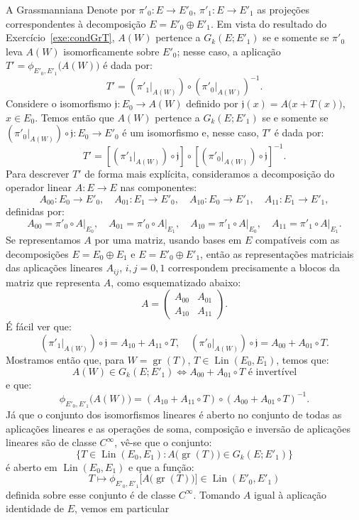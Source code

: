 \documentclass[oneside,11pt]{amsart}
\DeclareMathOperator{\Gr}{gr}
\DeclareMathOperator{\Lin}{Lin}
\theoremstyle{remark}\newtheorem{exercise}{Exercício}[section]
\theoremstyle{plain}\newtheorem{teo}{Teorema}[section]
\theoremstyle{plain}\newtheorem{lem}[teo]{Lema}
\theoremstyle{plain}\newtheorem{prop}[teo]{Proposição}
\theoremstyle{definition}\newtheorem{defin}[teo]{Definição}
\theoremstyle{remark}\newtheorem{rem}[teo]{Observação}
\theoremstyle{definition}\newtheorem{example}[teo]{Exemplo}
\numberwithin{equation}{section}
\begin{document}
\begin{section}{A Grassmanniana}
Denote por $\pi'_0:E\to E'_0$, $\pi'_1:E\to E'_1$ as projeções correspondentes à decomposição $E=E'_0\oplus E'_1$.
Em vista do resultado do Exercício~\ref{exe:condGrT}, $A(W)$ pertence a $G_k(E;E'_1)$ se e somente se $\pi'_0$ leva
$A(W)$ isomorficamente sobre $E'_0$; nesse caso, a aplicação $T'=\phi_{E'_0,E'_1}\big(A(W)\big)$ é dada por:
\[T'=(\pi'_1\vert_{A(W)})\circ(\pi'_0\vert_{A(W)})^{-1}.\]
Considere o isomorfismo $\mathfrak j:E_0\to A(W)$ definido por $\mathfrak j(x)=A\big(x+T(x)\big)$, $x\in E_0$.
Temos então que $A(W)$ pertence
a $G_k(E;E'_1)$ se e somente se $(\pi'_0\vert_{A(W)})\circ\mathfrak j:E_0\to E'_0$ é um isomorfismo e, nesse caso,
$T'$ é dada por:
\[T'=[(\pi'_1\vert_{A(W)})\circ\mathfrak j]\circ[(\pi'_0\vert_{A(W)})\circ\mathfrak j]^{-1}.\]
Para descrever $T'$ de forma mais explícita, consideramos a decomposição do operador linear $A:E\to E$ nas componentes:
\[A_{00}:E_0\longrightarrow E'_0,\quad A_{01}:E_1\longrightarrow E'_0,\quad
A_{10}:E_0\longrightarrow E'_1,\quad A_{11}:E_1\longrightarrow E'_1,\]
definidas por:
\[A_{00}=\pi'_0\circ A\vert_{E_0},\quad A_{01}=\pi'_0\circ A\vert_{E_1},\quad
A_{10}=\pi'_1\circ A\vert_{E_0},\quad A_{11}=\pi'_1\circ A\vert_{E_1}.\]
Se representamos $A$ por uma matriz, usando bases em $E$ compatíveis com as decomposições $E=E_0\oplus E_1$
e $E=E'_0\oplus E'_1$, então as representações matriciais das aplicações lineares $A_{ij}$, $i,j=0,1$ correspondem
precisamente a blocos da matriz que representa $A$, como esquematizado abaixo:
\[A=\begin{pmatrix}A_{00}&A_{01}\\A_{10}&A_{11}\end{pmatrix}.\]
É fácil ver que:
\[(\pi'_1\vert_{A(W)})\circ\mathfrak j=A_{10}+A_{11}\circ T,\quad
(\pi'_0\vert_{A(W)})\circ\mathfrak j=A_{00}+A_{01}\circ T.\]
Mostramos então que, para $W=\Gr(T)$, $T\in\Lin(E_0,E_1)$, temos que:
\[A(W)\in G_k(E;E'_1)\Longleftrightarrow\text{$A_{00}+A_{01}\circ T$ é invertível}\]
e que:
\[\phi_{E'_0,E'_1}\big(A(W)\big)=(A_{10}+A_{11}\circ T)\circ(A_{00}+A_{01}\circ T)^{-1}.\]
Já que o conjunto dos isomorfismos lineares é aberto no conjunto de todas as aplicações lineares
e as operações de soma, composição e inversão de aplicações lineares são de classe $C^\infty$, vê-se que
o conjunto:
\[\big\{T\in\Lin(E_0,E_1):A\big(\!\Gr(T)\big)\in G_k(E;E'_1)\big\}\]
é aberto em $\Lin(E_0,E_1)$ e que a função:
\[T\longmapsto\phi_{E'_0,E'_1}\big[A\big(\!\Gr(T)\big)\big]\in\Lin(E'_0,E'_1)\]
definida sobre esse conjunto é de classe $C^\infty$. Tomando $A$ igual à aplicação identidade de $E$, vemos em particular

\end{section}
\end{document}
